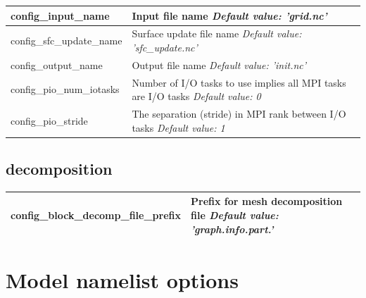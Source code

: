 \documentclass[11pt]{report}
\begin{document}
{\small
\begin{longtable}{|p{1.75in} |p{4.5in}|}
 \hline
   config\_input\_name         & Input file name \newline 
   {\em Default value: 'grid.nc'} \\ \hline
   
   config\_sfc\_update\_name        & Surface update file name \newline 
   {\em Default value: 'sfc\_update.nc'} \\ \hline   
 
   config\_output\_name        & Output file name \newline 
   {\em Default value: 'init.nc'} \\ \hline

   config\_pio\_num\_iotasks        & Number of I/O tasks to use \hfill\break 0 implies all MPI tasks are I/O tasks \newline 
   {\em Default value: 0} \\ \hline

   config\_pio\_stride        & The separation (stride) in MPI rank between I/O tasks \newline 
   {\em Default value: 1} \\ \hline
   
\end{longtable}
}

\section{decomposition}

{\small
\begin{longtable}{|p{1.75in} |p{4.5in}|}
 \hline
   config\_block\_decomp\_file\_prefix & Prefix for mesh decomposition file \newline 
   {\em Default value: 'graph.info.part.'}  \\ \hline

\end{longtable}
}


\chapter{Model namelist options}
\end{document}
